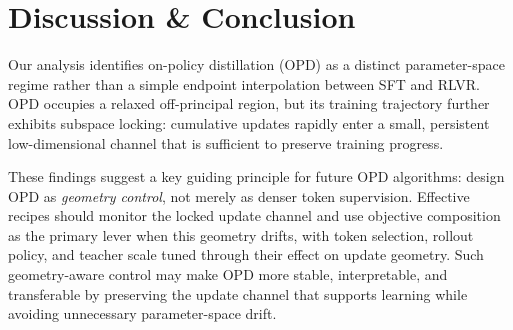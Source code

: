 



\section{Discussion \& Conclusion}
\label{sec:discussion}

Our analysis identifies on-policy distillation (OPD) as a distinct parameter-space regime rather than a simple endpoint interpolation between SFT and RLVR. OPD occupies a relaxed off-principal region, but its training trajectory further exhibits subspace locking: cumulative updates rapidly enter a small, persistent low-dimensional channel that is sufficient to preserve training progress.

These findings suggest a key guiding principle for future OPD algorithms:
design OPD as \emph{geometry control}, not merely as denser token
supervision. Effective recipes should monitor the locked update channel and
use objective composition as the primary lever when this geometry drifts,
with token selection, rollout policy, and teacher scale tuned through their
effect on update geometry. Such geometry-aware control may make OPD more
stable, interpretable, and transferable by preserving the update channel
that supports learning while avoiding unnecessary parameter-space drift.
